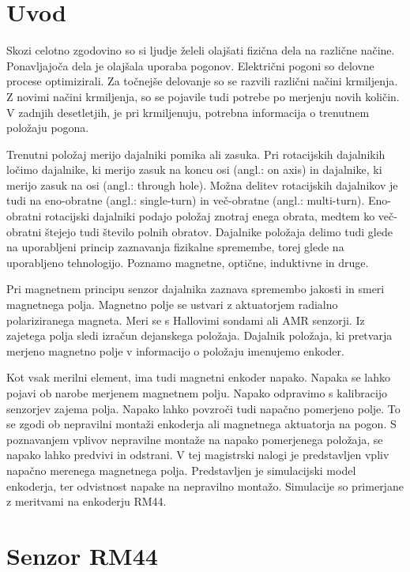 \chapter{Uvod} \label{uvod}

Skozi celotno zgodovino so si ljudje želeli olajšati fizična dela na različne načine. Ponavljajoča dela je olajšala uporaba pogonov. Električni pogoni so delovne procese optimizirali. Za točnejše delovanje so se razvili različni načini krmiljenja. Z novimi načini krmiljenja, so se pojavile tudi potrebe po merjenju novih količin. V zadnjih desetletjih, je pri krmiljenuju, potrebna informacija o trenutnem položaju pogona.

Trenutni položaj merijo dajalniki pomika ali zasuka. Pri rotacijskih dajalnikih ločimo dajalnike, ki merijo zasuk na koncu osi (angl.: on axis) in dajalnike, ki merijo zasuk na osi (angl.: through hole). Možna delitev rotacijskih dajalnikov je tudi na eno-obratne (angl.: single-turn) in več-obratne (angl.: multi-turn). Eno-obratni rotacijski dajalniki podajo položaj znotraj enega obrata, medtem ko več-obratni štejejo tudi število polnih obratov. Dajalnike položaja delimo tudi glede na uporabljeni princip zaznavanja fizikalne
spremembe, torej glede na uporabljeno tehnologijo. Poznamo magnetne, optične,
induktivne in druge\cite{killer}.

Pri magnetnem principu senzor dajalnika zaznava spremembo jakosti in smeri
magnetnega polja. 
Magnetno polje se ustvari z aktuatorjem radialno polariziranega magneta. Meri se s Hallovimi sondami ali AMR senzorji. Iz zajetega polja sledi izračun dejanskega položaja. Dajalnik položaja, ki pretvarja merjeno magnetno polje v informacijo o položaju imenujemo enkoder.

Kot vsak merilni element, ima tudi magnetni enkoder napako. Napaka se lahko pojavi ob narobe merjenem magnetnem polju. Napako odpravimo s kalibracijo senzorjev zajema polja. Napako lahko povzroči tudi napačno pomerjeno polje. To se zgodi ob nepravilni montaži enkoderja ali magnetnega aktuatorja na pogon. S poznavanjem vplivov nepravilne montaže na napako pomerjenega položaja, se napako lahko predvivi in odstrani.
V tej magistrski nalogi je predstavljen vpliv napačno merenega magnetnega polja. Predstavljen je simulacijski model enkoderja, ter odvistnost napake na nepravilno montažo. Simulacije so primerjane z meritvami na enkoderju RM44.


\chapter{Senzor RM44}

